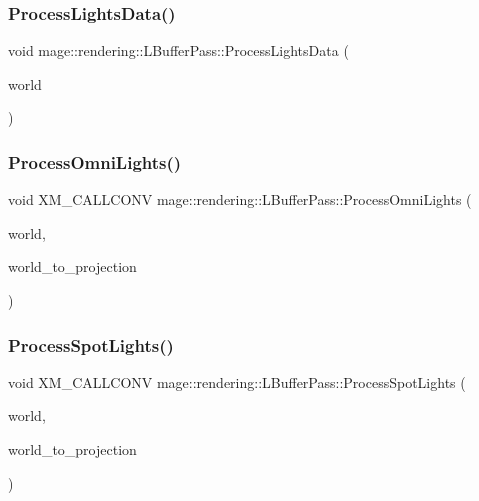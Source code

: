 \subsubsection{\texorpdfstring{Process\+Lights\+Data()}{ProcessLightsData()}}
{\footnotesize\ttfamily void mage\+::rendering\+::\+L\+Buffer\+Pass\+::\+Process\+Lights\+Data (\begin{DoxyParamCaption}\item[{const \mbox{\hyperlink{classmage_1_1rendering_1_1_world}{World}} \&}]{world }\end{DoxyParamCaption})\hspace{0.3cm}{\ttfamily [private]}}

\mbox{\label{classmage_1_1rendering_1_1_l_buffer_pass_af9e7e859505ec7ee16155f4e11d98a67}} 
\subsubsection{\texorpdfstring{Process\+Omni\+Lights()}{ProcessOmniLights()}}
{\footnotesize\ttfamily void X\+M\+\_\+\+C\+A\+L\+L\+C\+O\+NV mage\+::rendering\+::\+L\+Buffer\+Pass\+::\+Process\+Omni\+Lights (\begin{DoxyParamCaption}\item[{const \mbox{\hyperlink{classmage_1_1rendering_1_1_world}{World}} \&}]{world,  }\item[{F\+X\+M\+M\+A\+T\+R\+IX}]{world\+\_\+to\+\_\+projection }\end{DoxyParamCaption})\hspace{0.3cm}{\ttfamily [private]}}

\mbox{\label{classmage_1_1rendering_1_1_l_buffer_pass_a3172ee6a91c34a1dbf252c388fe1ac20}} 
\subsubsection{\texorpdfstring{Process\+Spot\+Lights()}{ProcessSpotLights()}}
{\footnotesize\ttfamily void X\+M\+\_\+\+C\+A\+L\+L\+C\+O\+NV mage\+::rendering\+::\+L\+Buffer\+Pass\+::\+Process\+Spot\+Lights (\begin{DoxyParamCaption}\item[{const \mbox{\hyperlink{classmage_1_1rendering_1_1_world}{World}} \&}]{world,  }\item[{F\+X\+M\+M\+A\+T\+R\+IX}]{world\+\_\+to\+\_\+projection }\end{DoxyParamCaption})\hspace{0.3cm}{\ttfamily [private]}}

